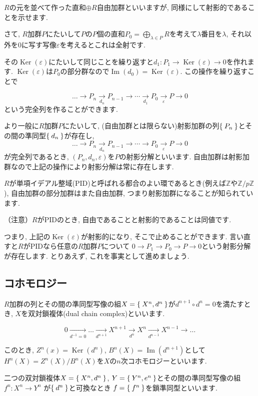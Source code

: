 \documentclass{jsarticle}
\newcommand{\ZZ}{\mathbb{Z}}
\newcommand{\makeop}[1]{\mathop{\mathrm{#1}}\nolimits}
\def\Im{\makeop{Im}}
\def\Ker{\makeop{Ker}}
\theoremstyle{definition}
\numberwithin{theorem}{section}
\begin{document}
$R$の元を並べて作った直和$\oplus R$自由加群といいますが, 同様にして射影的であることを示せます.

さて, $R$加群$P$にたいして$P$の$P$個の直和$\displaystyle P_0 = \bigoplus_{\lambda\in P} R$を考えて$\lambda$番目を$\lambda$, それ以外を0に写す写像$\varepsilon$を考えるとこれは全射です.

その$\Ker(\varepsilon)$にたいして同じことを繰り返すと$d_1: P_1 \rightarrow \Ker(\varepsilon) \rightarrow 0$を作れます.
$\Ker(\varepsilon)$は$P_0$の部分群なので$\Im(d_0) = \Ker(\varepsilon)$. この操作を繰り返すことで

\[
\ldots \rightarrow P_n \xrightarrow[d_n]{} P_{n-1} \rightarrow \cdots \xrightarrow[d_1]{} P_0 \xrightarrow[\varepsilon]{} P \rightarrow 0
\]
という完全列を作ることができます.

より一般に$R$加群$P$にたいして, (自由加群とは限らない)射影加群の列$\Set{P_n}$とその間の準同型$\Set{d_n}$が存在し,
\[
\ldots \rightarrow P_n \xrightarrow[d_n]{} P_{n-1} \rightarrow \cdots \rightarrow P_0 \xrightarrow[\varepsilon]{} P \rightarrow 0
\]
が完全列であるとき, $(P_n, d_n, \varepsilon)$を$P$の射影分解といいます. 自由加群は射影加群なので上記の操作により射影分解は常に存在します.

$R$が単項イデアル整域(PID)と呼ばれる都合のよい環であるとき(例えば$\ZZ$や$\ZZ/p\ZZ$), 自由加群の部分加群はまた自由加群, つまり射影加群になることが知られています.

（注意）$R$がPIDのとき, 自由であることと射影的であることは同値です.

つまり, 上記の$\Ker(\varepsilon)$が射影的になり, そこで止めることができます. 言い直すと$R$がPIDなら任意の$R$加群$P$について
$0\rightarrow P_1 \rightarrow P_0 \rightarrow P \rightarrow 0$という射影分解が存在します. とりあえず, これを事実として進めましょう.

\subsection{コホモロジー}
$R$加群の列とその間の準同型写像の組$X = \Set{X^n, d^n}$が$d^{n+1} \circ d^n = 0$を満たすとき, $X$を双対鎖複体(dual chain complex)といいます.

\[
0 \xrightarrow[d^{-1} = 0]{} \ldots \xrightarrow[d^{n+1}]{} X^{n+1} \xrightarrow[d^n]{} X^n \xrightarrow[d^{n-1}]{} X^{n-1} \rightarrow \ldots
\]

このとき, $Z^n(x) = \Ker(d^n)$, $B^n(X) = \Im(d^{n+1})$として$H^n(X) = Z^n(X)/B^n(X)$を$X$の$n$次コホモロジーといいます.

二つの双対鎖複体$X = \Set{X^n, d^n}$, $Y = \Set{Y^n, e^n}$とその間の準同型写像の組$f^n:X^n \rightarrow Y^n$
が$\Set{d^n}$と可換なとき $f = \Set{f^n}$を鎖準同型といいます.
\end{document}
